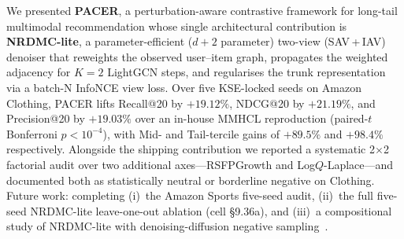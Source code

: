 \documentclass[conference]{IEEEtran}
\begin{document}
We presented \textbf{PACER}, a perturbation-aware contrastive
framework for long-tail multimodal recommendation whose single
architectural contribution is \textbf{NRDMC-lite}, a parameter-efficient
($d{+}2$ parameter) two-view (SAV\,+\,IAV) denoiser that reweights
the observed user--item graph, propagates the weighted adjacency for
$K{=}2$ LightGCN steps, and regularises the trunk representation via
a batch-N InfoNCE view loss. Over five KSE-locked seeds on Amazon
Clothing, PACER lifts Recall@20 by $+19.12\%$, NDCG@20 by $+21.19\%$,
and Precision@20 by $+19.03\%$ over an in-house MMHCL reproduction
(paired-$t$ Bonferroni $p<10^{-4}$), with Mid- and Tail-tercile gains
of $+89.5\%$ and $+98.4\%$ respectively. Alongside the shipping
contribution we reported a systematic 2$\times$2 factorial audit
over two additional axes---RSFPGrowth and Log$Q$-Laplace---and
documented both as statistically neutral or borderline negative on
Clothing. Future work: completing (i)~the Amazon Sports five-seed
audit, (ii)~the full five-seed NRDMC-lite leave-one-out ablation
(cell \S9.36a), and (iii)~a compositional study of NRDMC-lite with
denoising-diffusion negative sampling~\cite{nguyen2024diffusion}.



\end{document}
